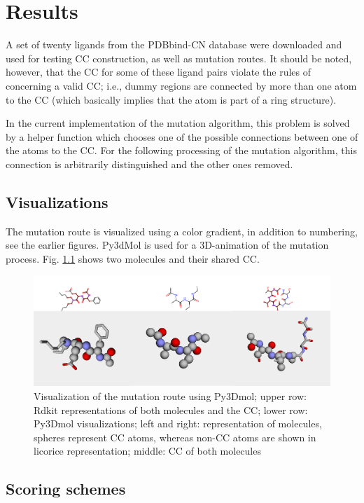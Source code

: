 \chapter{Results}

A set of twenty ligands from the PDBbind-CN database were downloaded and used for testing
CC construction, as well as mutation routes. It
should be noted, however, that the CC for some of these ligand pairs
violate the rules of {\trafo} concerning a valid CC; i.e., dummy regions are connected by more
than one atom to the CC (which basically implies that the
atom is part of a ring structure). 

In the current implementation of the mutation algorithm, this problem
is solved by a helper function which chooses one of the possible connections
between one of the atoms to the CC. For the following processing
of the mutation algorithm, this connection is arbitrarily distinguished
and the other ones removed. 


\section{Visualizations}

The mutation route is visualized using a color gradient, in addition
to numbering, see the earlier figures.
Py3dMol is used for a 3D-animation of the mutation process. Fig. \ref{fig:py3dmol} shows two molecules and their shared CC.

\begin{figure}
\includegraphics[scale=0.35]{trafo_py3d_1verkleinert}

\caption{Visualization of the mutation route using Py3Dmol; upper row: Rdkit representations
of both molecules and the CC; lower row: Py3Dmol visualizations;
left and right: representation of molecules, spheres represent CC atoms, whereas non-CC atoms are shown in licorice representation; middle: CC of both molecules}
\label{fig:py3dmol}
\end{figure}


\section{Scoring schemes}

